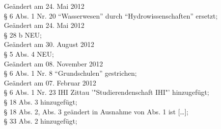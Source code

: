 Geändert am 24. Mai 2012\\
§ 6 Abs. 1 Nr. 20 "`Wasserwesen"' durch "`Hydrowissenschaften"' ersetzt; \\

Geändert am 24. Mai 2012\\
§ 28 b NEU; \\

Geändert am 30. August 2012\\
§ 5 Abs. 4 NEU; \\

Geändert am 08. November 2012\\
§ 6 Abs. 1 Nr. 8 "`Grundschulen"' gestrichen; \\

Geändert am 07. Februar 2012\\
§ 6 Abs. 1 Nr. 23 IHI Zittau '"Studierendenschaft IHI"' hinzugefügt; \\
§ 18 Abs. 3 hinzugefügt; \\
§ 18 Abs. 2, Abs. 3 geändert in Ausnahme von Abs. 1 ist [\ldots]; \\
§ 33 Abs. 2 hinzugefügt; \\

\normalsize
